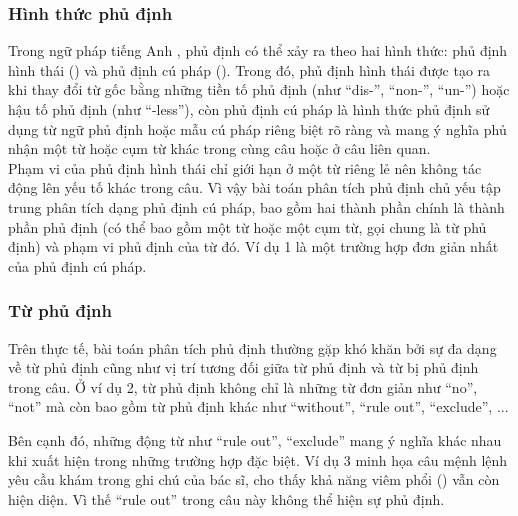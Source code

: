 \subsubsection*{Hình thức phủ định}

Trong ngữ pháp tiếng Anh \cite{Givon1993}, phủ định có thể xảy ra theo hai hình thức: phủ định hình thái () và phủ định cú pháp (). Trong đó, phủ định hình thái được tạo ra khi thay đổi từ gốc bằng những tiền tố phủ định (như ``dis-'', ``non-'', ``un-'') hoặc hậu tố phủ định (như ``-less''), còn phủ định cú pháp là hình thức phủ định sử dụng từ ngữ phủ định hoặc mẫu cú pháp riêng biệt rõ ràng và mang ý nghĩa phủ nhận một từ hoặc cụm từ khác trong cùng câu hoặc ở câu liên quan.\\

Phạm vi của phủ định hình thái chỉ giới hạn ở một từ riêng lẻ nên không tác động lên yếu tố khác trong câu. Vì vậy bài toán phân tích phủ định chủ yếu tập trung phân tích dạng phủ định cú pháp, bao gồm hai thành phần chính là thành phần phủ định (có thể bao gồm một từ hoặc một cụm từ, gọi chung là từ phủ định) và phạm vi phủ định của từ đó. Ví dụ 1 là một trường hợp đơn giản nhất của phủ định cú pháp.

\subsubsection*{Từ phủ định}

Trên thực tế, bài toán phân tích phủ định thường gặp khó khăn bởi sự đa dạng về từ phủ định cũng như vị trí tương đối giữa từ phủ định và từ bị phủ định trong câu. Ở ví dụ 2, từ phủ định không chỉ là những từ đơn giản như ``no'', ``not'' mà còn bao gồm từ phủ định khác như ``without'', ``rule out'', ``exclude'', ... 


Bên cạnh đó, những động từ như ``rule out'', ``exclude'' mang ý nghĩa khác nhau khi xuất hiện trong những trường hợp đặc biệt. Ví dụ 3 minh họa câu mệnh lệnh yêu cầu khám trong ghi chú của bác sĩ, cho thấy khả năng viêm phổi () vẫn còn hiện diện. Vì thế ``rule out'' trong câu này không thể hiện sự phủ định.


